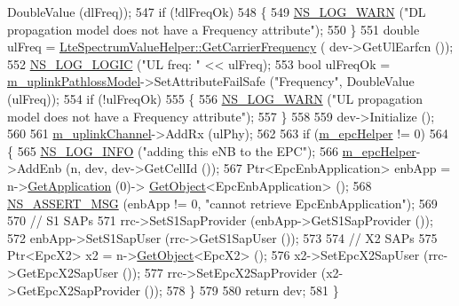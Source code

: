 \begin{DoxyCode}
      DoubleValue (dlFreq));
547   \textcolor{keywordflow}{if} (!dlFreqOk)
548     \{
549       \hyperlink{group__logging_gade7208b4009cdf0e25783cd26766f559}{NS\_LOG\_WARN} (\textcolor{stringliteral}{"DL propagation model does not have a Frequency attribute"});
550     \}
551   \textcolor{keywordtype}{double} ulFreq = \hyperlink{classns3_1_1LteSpectrumValueHelper_a07e5a6638c218927b61da7b75ae0b786}{LteSpectrumValueHelper::GetCarrierFrequency} (
      dev->GetUlEarfcn ());
552   \hyperlink{group__logging_ga88acd260151caf2db9c0fc84997f45ce}{NS\_LOG\_LOGIC} (\textcolor{stringliteral}{"UL freq: "} << ulFreq);
553   \textcolor{keywordtype}{bool} ulFreqOk = \hyperlink{classns3_1_1LteHelper_a0b121aecc2a13aab12908c8547ba336b}{m\_uplinkPathlossModel}->SetAttributeFailSafe (\textcolor{stringliteral}{"Frequency"}, 
      DoubleValue (ulFreq));
554   \textcolor{keywordflow}{if} (!ulFreqOk)
555     \{
556       \hyperlink{group__logging_gade7208b4009cdf0e25783cd26766f559}{NS\_LOG\_WARN} (\textcolor{stringliteral}{"UL propagation model does not have a Frequency attribute"});
557     \}
558 
559   dev->Initialize ();
560 
561   \hyperlink{classns3_1_1LteHelper_ad61b21e2f55749e680942016b2e57abe}{m\_uplinkChannel}->AddRx (ulPhy);
562 
563   \textcolor{keywordflow}{if} (\hyperlink{classns3_1_1LteHelper_aeec42671d76d5bd719b37d77bfd27633}{m\_epcHelper} != 0)
564     \{
565       \hyperlink{group__logging_gafbd73ee2cf9f26b319f49086d8e860fb}{NS\_LOG\_INFO} (\textcolor{stringliteral}{"adding this eNB to the EPC"});
566       \hyperlink{classns3_1_1LteHelper_aeec42671d76d5bd719b37d77bfd27633}{m\_epcHelper}->AddEnb (n, dev, dev->GetCellId ());
567       Ptr<EpcEnbApplication> enbApp = n->\hyperlink{classns3_1_1Node_ad0ab54d76712398c0a8e25d9ac59ea41}{GetApplication} (0)->
      \hyperlink{classns3_1_1Object_a13e18c00017096c8381eb651d5bd0783}{GetObject}<EpcEnbApplication> ();
568       \hyperlink{assert_8h_aff5ece9066c74e681e74999856f08539}{NS\_ASSERT\_MSG} (enbApp != 0, \textcolor{stringliteral}{"cannot retrieve EpcEnbApplication"});
569 
570       \textcolor{comment}{// S1 SAPs}
571       rrc->SetS1SapProvider (enbApp->GetS1SapProvider ());
572       enbApp->SetS1SapUser (rrc->GetS1SapUser ());
573 
574       \textcolor{comment}{// X2 SAPs}
575       Ptr<EpcX2> x2 = n->\hyperlink{classns3_1_1Object_a13e18c00017096c8381eb651d5bd0783}{GetObject}<EpcX2> ();
576       x2->SetEpcX2SapUser (rrc->GetEpcX2SapUser ());
577       rrc->SetEpcX2SapProvider (x2->GetEpcX2SapProvider ());
578     \}
579 
580   \textcolor{keywordflow}{return} dev;
581 \}
\end{DoxyCode}



